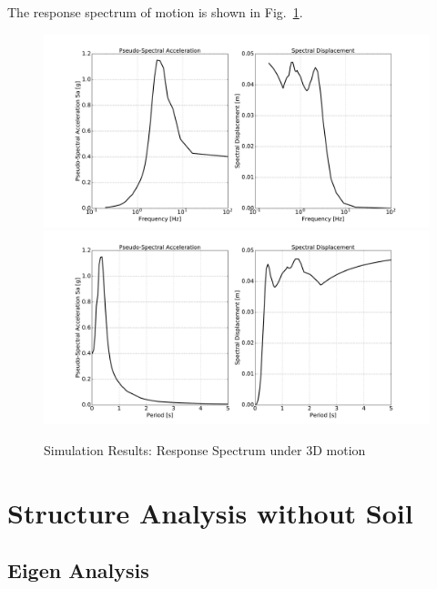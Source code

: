 The response spectrum of motion is shown in Fig.~\ref{fig_spectrum_freq_period_time_series_ssi3d_3D_motion}.
\begin{figure}[H]
  \centering
  \includegraphics[width = 15cm]{./Figure-files/nonlinear_analysis_steps/soil-structure-3D-ans/shell_structure_motion_node_3195_x_spectrum_freq.pdf}
  \includegraphics[width = 15cm]{./Figure-files/nonlinear_analysis_steps/soil-structure-3D-ans/shell_structure_motion_node_3195_x_spectrum_period.pdf}
  \caption{Simulation Results: Response Spectrum under 3D motion}
  \label{fig_spectrum_freq_period_time_series_ssi3d_3D_motion}
\end{figure}


\clearpage
\newpage
\section{Structure Analysis without Soil}
\label{structure_only_3D}

\subsection{Eigen Analysis}

